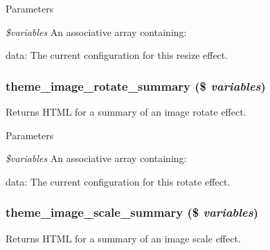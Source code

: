 \begin{DoxyParams}{Parameters}
\item[{\em \$variables}]An associative array containing:
\begin{DoxyItemize}
\item data: The current configuration for this resize effect. 
\end{DoxyItemize}\end{DoxyParams}
\hypertarget{group__themeable_gae47fb79da2660519fd8f650af8486a59}{
\subsubsection[{theme\_\-image\_\-rotate\_\-summary}]{\setlength{\rightskip}{0pt plus 5cm}theme\_\-image\_\-rotate\_\-summary (\$ {\em variables})}}
\label{group__themeable_gae47fb79da2660519fd8f650af8486a59}
Returns HTML for a summary of an image rotate effect.


\begin{DoxyParams}{Parameters}
\item[{\em \$variables}]An associative array containing:
\begin{DoxyItemize}
\item data: The current configuration for this rotate effect. 
\end{DoxyItemize}\end{DoxyParams}
\hypertarget{group__themeable_gaed6cfce9b86de8f5c500bf9228134cf5}{
\subsubsection[{theme\_\-image\_\-scale\_\-summary}]{\setlength{\rightskip}{0pt plus 5cm}theme\_\-image\_\-scale\_\-summary (\$ {\em variables})}}
\label{group__themeable_gaed6cfce9b86de8f5c500bf9228134cf5}
Returns HTML for a summary of an image scale effect.


